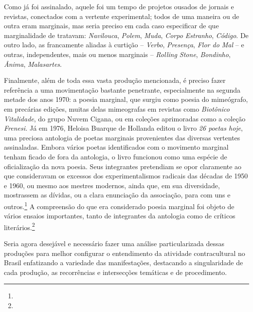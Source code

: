 Como já foi assinalado, aquele foi um tempo de projetos ousados de
jornais e revistas, conectados com a vertente experimental; todos de uma
maneira ou de outra eram marginais, mas seria preciso em cada caso
especificar de que marginalidade de tratavam: \emph{Navilouca},
\emph{Polem}, \emph{Muda}, \emph{Corpo Estranho}, \emph{Código}. De
outro lado, as francamente aliadas à curtição -- \emph{Verbo},
\emph{Presença}, \emph{Flor do Mal} -- e outras, independentes, mais ou
menos marginais -- \emph{Rolling Stone}, \emph{Bondinho}, \emph{Ânima},
\emph{Malasartes}.

Finalmente, além de toda essa vasta produção mencionada, é preciso fazer
referência a uma movimentação bastante penetrante, especialmente na
segunda metade dos anos 1970: a poesia marginal, que surgiu como poesia
do mimeógrafo, em precárias edições, muitas delas mimeografas em
revistas como \emph{Biotônico Vitalidade}, do grupo Nuvem Cigana, ou em
coleções aprimoradas como a coleção \emph{Frenesi.} Já em 1976, Heloisa
Buarque de Hollanda editou o livro \emph{26 poetas hoje}, uma preciosa
antologia de poetas marginais provenientes das diversas vertentes
assinaladas. Embora vários poetas identificados com o movimento marginal
tenham ficado de fora da antologia, o livro funcionou como uma espécie
de oficialização da nova poesia. Seus integrantes pretendiam se opor
claramente ao que consideravam os excessos dos experimentalismos
radicais das décadas de 1950 e 1960, ou mesmo aos mestres modernos,
ainda que, em sua diversidade, mostrassem as dívidas, ou a clara
enunciação da associação, para com uns e outros.\footnote{} A compreensão do que
era considerado poesia marginal foi objeto de vários ensaios
importantes, tanto de integrantes da antologia como de críticos
literários.\footnote{}

\asterisc

Seria agora desejável e necessário fazer uma análise particularizada
dessas produções para melhor configurar o entendimento da atividade
contracultural no Brasil enfatizando a variedade das manifestações,
destacando a singularidade de cada produção, as recorrências e
intersecções temáticas e de procedimento.


